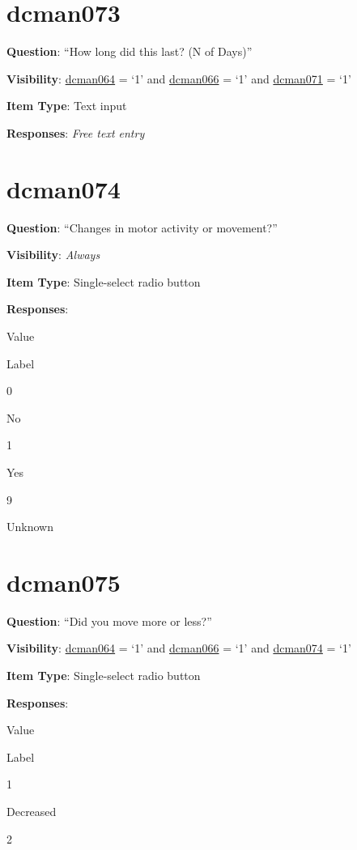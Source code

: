 \documentclass[]{book}
\begin{document}
\hypertarget{dcman073}{%
\section{dcman073}\label{dcman073}}

\textbf{Question}: ``How long did this last? (N of Days)''

\textbf{Visibility}: \protect\hyperlink{dcman064}{dcman064} = `1' and \protect\hyperlink{dcman066}{dcman066} = `1' and \protect\hyperlink{dcman071}{dcman071} = `1'

\textbf{Item Type}: Text input

\textbf{Responses}: \emph{Free text entry}

\hypertarget{dcman074}{%
\section{dcman074}\label{dcman074}}

\textbf{Question}: ``Changes in motor activity or movement?''

\textbf{Visibility}: \emph{Always}

\textbf{Item Type}: Single-select radio button

\textbf{Responses}:

Value

Label

0

No

1

Yes

9

Unknown

\hypertarget{dcman075}{%
\section{dcman075}\label{dcman075}}

\textbf{Question}: ``Did you move more or less?''

\textbf{Visibility}: \protect\hyperlink{dcman064}{dcman064} = `1' and \protect\hyperlink{dcman066}{dcman066} = `1' and \protect\hyperlink{dcman074}{dcman074} = `1'

\textbf{Item Type}: Single-select radio button

\textbf{Responses}:

Value

Label

1

Decreased

2
\end{document}
